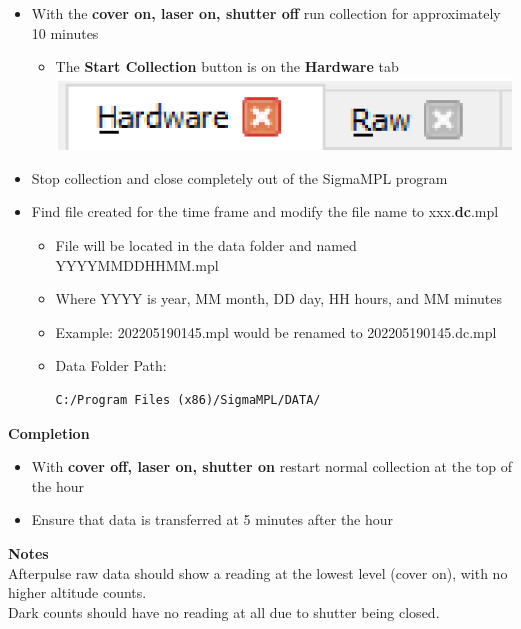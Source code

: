 \documentclass[11pt, oneside]{article}
\newenvironment{myitemize}
{ \begin{itemize}
    \setlength{\itemsep}{0pt}
    \setlength{\parskip}{0pt}
    \setlength{\parsep}{0pt}     }
{ \end{itemize}                  }
\begin{document}
\begin{myitemize}
\item With the \textbf{cover on, laser on, shutter off} run collection for approximately 10 minutes
\begin{myitemize}
\item The \textbf{Start Collection} button is on the \textbf{Hardware} tab \includegraphics[scale=0.3]{hardware_tab.png}
\end{myitemize}
\item Stop collection and close completely out of the SigmaMPL program
\item Find file created for the time frame and modify the file name to xxx.\textbf{dc}.mpl
\begin{myitemize}
\item File will be located in the data folder and named YYYYMMDDHHMM.mpl
\item Where YYYY is year, MM month, DD day, HH hours, and MM minutes
\item Example: 202205190145.mpl would be renamed to 202205190145.dc.mpl
\item Data Folder Path:\begin{verbatim}C:/Program Files (x86)/SigmaMPL/DATA/\end{verbatim}
\end{myitemize}
\end{myitemize}

\noindent\textbf{\LARGE Completion}

\begin{myitemize}
\item With \textbf{cover off, laser on, shutter on} restart normal collection at the top of the hour
\item Ensure that data is transferred at 5 minutes after the hour
\end{myitemize}
	
\newpage
\noindent\textbf{\large Notes}\\

\noindent Afterpulse raw data should show a reading at the lowest level (cover on), with no higher altitude counts.\\ 

\noindent Dark counts should have no reading at all due to shutter being closed.\\
\end{document}
